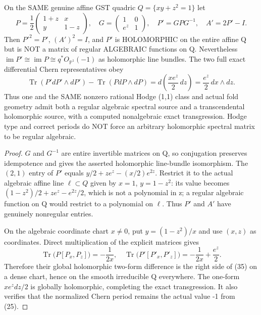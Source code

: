 \documentclass[11pt]{article}
\begin{document}
\begin{proposition}
On the SAME genuine affine GST quadric
$Q=\{xy+z^2=1\}$ let
\[
 P=\frac12\begin{pmatrix}1+z&x\\y&1-z\end{pmatrix},
 \quad
 G=\begin{pmatrix}1&0\\e^z&1\end{pmatrix},
 \quad P'=GPG^{-1},\quad A'=2P'-I .
\]
Then $P'^2=P'$, $(A')^2=I$, and $P'$ is
HOLOMORPHIC on the entire affine Q but is NOT
a matrix of regular ALGEBRAIC functions on Q.
Nevertheless $\operatorname{im}P'\cong\operatorname{im}P
\cong q^*O_{\mathbb P^1}(-1)$ as holomorphic line bundles.
The two full exact differential Chern representatives obey
\[
 \boxed{\operatorname{Tr}(P'dP'\wedge dP')
       -\operatorname{Tr}(PdP\wedge dP)
     =d\left(\frac{x e^z}{2}\,dz\right)
     =\frac{e^z}{2}\,dx\wedge dz .}                       \tag{35}
\]
Thus one and the SAME nonzero rational Hodge (1,1) class
and actual fold geometry admit both a regular algebraic
spectral source and a transcendental holomorphic source,
with a computed nonalgebraic exact transgression.
Hodge type and correct periods do NOT force an arbitrary
holomorphic spectral matrix to be regular algebraic.
\end{proposition}
\begin{proof}
$G$ and $G^{-1}$ are entire invertible matrices
on Q, so conjugation preserves idempotence and
gives the asserted holomorphic line-bundle isomorphism.
The $(2,1)$ entry of $P'$ equals
$y/2+ze^z-(x/2)e^{2z}$.
Restrict it to the actual algebraic affine line
$\ell\subset Q$ given by $x=1$, $y=1-z^2$:
its value becomes
$(1-z^2)/2+ze^z-e^{2z}/2$, which is not
a polynomial in z; a regular algebraic function
on Q would restrict to a polynomial on $\ell$.
Thus $P'$ and $A'$ have genuinely nonregular entries.

On the algebraic coordinate chart $x\ne0$,
put $y=(1-z^2)/x$ and use $(x,z)$ as coordinates.
Direct multiplication of the explicit
matrices gives
\[
 \operatorname{Tr}\bigl(P[P_x,P_z]\bigr)=-\frac1{2x},
 \quad
 \operatorname{Tr}\bigl(P'[P'_x,P'_z]\bigr)
       =-\frac1{2x}+\frac{e^z}{2}.
\]
Therefore their global holomorphic two-form difference
is the right side of (35) on a dense chart,
hence on the smooth irreducible Q everywhere.
The one-form $x e^z dz/2$ is globally
holomorphic, completing the exact transgression.
It also verifies that the normalized Chern period
remains the actual value -1 from (25).
\end{proof}
\end{document}

